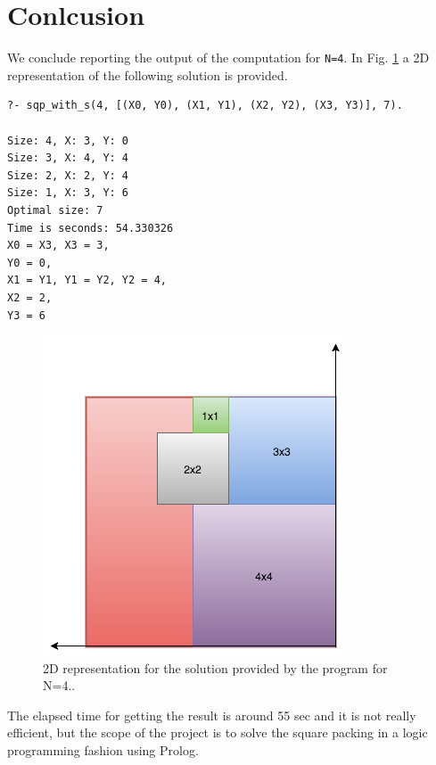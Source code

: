 \documentclass{article}[10pt]
\begin{document}
\section{Conlcusion}

We conclude reporting the output of the computation for \texttt{N=4}. In Fig. \ref{fig:sqp} a 2D representation of the following solution is provided.

\footnotesize
\begin{verbatim}
?- sqp_with_s(4, [(X0, Y0), (X1, Y1), (X2, Y2), (X3, Y3)], 7).

Size: 4, X: 3, Y: 0
Size: 3, X: 4, Y: 4
Size: 2, X: 2, Y: 4
Size: 1, X: 3, Y: 6
Optimal size: 7
Time is seconds: 54.330326
X0 = X3, X3 = 3,
Y0 = 0,
X1 = Y1, Y1 = Y2, Y2 = 4,
X2 = 2,
Y3 = 6 
\end{verbatim}

\normalsize
\begin{figure}[h]
\centering
\includegraphics[scale=0.4]{sqpn4}
\caption{2D representation for the solution provided by the program for N=4..}
\label{fig:sqp}
\end{figure}

The elapsed time for getting the result is around 55 sec and it is not really efficient, but the scope of the project is to solve the square packing in a logic programming fashion using Prolog.
\end{document}
